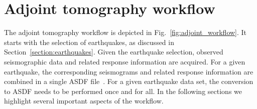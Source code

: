 \documentclass[extra,mreferee]{gji}
\begin{document}




\section{Adjoint tomography workflow}
\label{section:workflow}

The adjoint tomography workflow is depicted in Fig.~\ref{fig:adjoint_workflow}.
It starts with the selection of earthquakes, as discussed in Section~\ref{section:earthquakes}.
Given the earthquake selection,
observed seismographic data and related response information are acquired.
For a given earthquake,
the corresponding seismograms and related response information are combined in a single ASDF file~\citep{krischer2016adaptable}.
For a given earthquake data set, the conversion to ASDF needs to be performed once and for all.
In the following sections we highlight several important aspects of the workflow.
\end{document}
